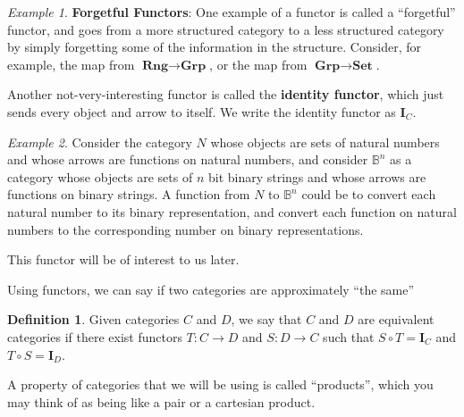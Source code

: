 \documentclass[14pt]{extarticle}  %
\theoremstyle{plain}
\theoremstyle{definition}
\newtheorem{defn}[thm]{Definition}
\theoremstyle{remark}
\newtheorem*{ex}{Example}
\begin{document}
\begin{ex} \textbf{Forgetful Functors}: One example of a functor is called a ``forgetful'' functor, and goes from a more structured category to a less structured
  category by simply forgetting some of the information in the structure. Consider, for example, the map from $\textbf{Rng} \to \textbf{Grp}$, or the map from $\textbf{Grp}\to\textbf{Set}$.

  Another not-very-interesting functor is called the \textbf{identity functor}, which just sends every object and arrow to itself. We write the identity functor as $\textbf{I}_{C}$.
\end{ex}

\begin{ex}
  Consider the category $N$ whose objects are sets of natural numbers and whose arrows are functions on natural numbers, and consider $\mathbb{B}^{n}$ as a category whose objects
  are sets of $n$ bit binary strings and whose arrows are functions on binary strings. A function from $N$ to $\mathbb{B}^{n}$ could be to convert each natural number to its binary representation,
  and convert each function on natural numbers to the corresponding number on binary representations.

  This functor will be of interest to us later.
\end{ex}


Using functors, we can say if two categories are approximately ``the same''

\begin{defn}
  Given categories $C$ and $D$, we say that $C$ and $D$ are equivalent categories if there exist functors $T : C \to D$ and $S : D \to C$ such that $S \circ T = \textbf{I}_{C}$ and $T \circ S = \textbf{I}_{D}$.
\end{defn}


A property of categories that we will be using is called ``products'', which you may think of as being like a pair or a cartesian product.
\end{document}
